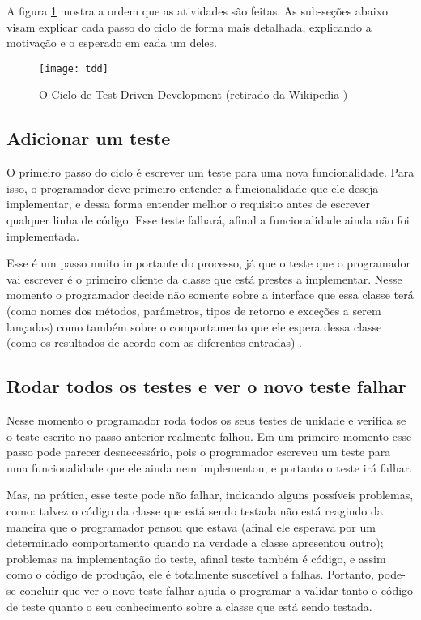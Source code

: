 A figura \ref{fig:tdd} mostra a ordem que as atividades são feitas. 
As sub-seções abaixo visam explicar cada passo do ciclo de forma mais detalhada, explicando a motivação e o esperado 
em cada um deles.

\begin{figure}
  \centering
  \texttt{[image: tdd]}
  \caption{O Ciclo de Test-Driven Development (retirado da Wikipedia \cite{figura-tdd-wiki}) }
  \label{fig:tdd}
\end{figure}

\subsection{Adicionar um teste}

O primeiro passo do ciclo é escrever um teste para uma nova funcionalidade. Para isso, o programador deve primeiro entender a funcionalidade 
que ele deseja implementar, e dessa forma entender melhor o requisito antes de escrever qualquer linha de código.
Esse teste falhará, afinal a funcionalidade ainda não foi implementada. 

Esse é um passo muito importante do processo, já que o teste que o programador vai escrever é o primeiro cliente da classe que está
prestes a implementar. Nesse momento o programador decide não somente sobre a interface que essa classe terá (como nomes dos métodos,
parâmetros, tipos de retorno e exceções a serem lançadas) como também sobre o comportamento que ele espera dessa classe (como 
os resultados de acordo com as diferentes entradas) \cite{GOOS}.

\subsection{Rodar todos os testes e ver o novo teste falhar}

Nesse momento o programador roda todos os seus testes de unidade e verifica se o teste escrito no passo anterior realmente falhou. Em um
primeiro momento esse passo pode parecer desnecessário, pois o programador escreveu um teste para uma funcionalidade que ele ainda nem
implementou, e portanto o teste irá falhar. 

Mas, na prática, esse teste pode não falhar, indicando alguns possíveis problemas, como: talvez o código da classe que está sendo testada
não está reagindo da maneira que o programador pensou que estava (afinal ele esperava por um determinado comportamento quando na verdade a
classe apresentou outro); problemas na implementação do teste, afinal teste também é código, e assim como o código de produção, ele é
totalmente suscetível a falhas.
Portanto, pode-se concluir que ver o novo teste falhar ajuda o programar a validar tanto o código de teste quanto o seu conhecimento
sobre a classe que está sendo testada. 

